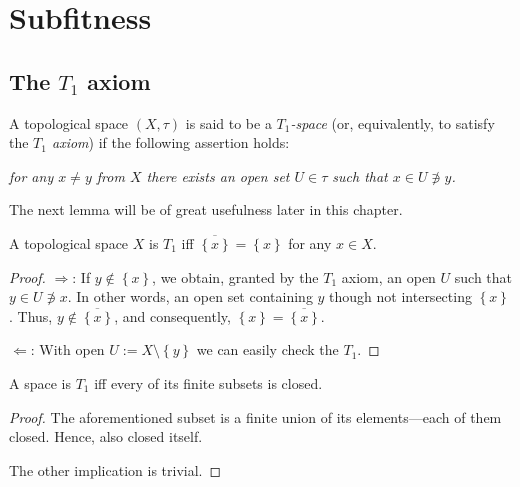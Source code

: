 \chapter{Subfitness}

\section{The $T_1$ axiom}

\begin{framed}
  \begin{df}[$T_1$]
    A topological space $(X, \tau)$ is said to be a \emph{$T_1$-space\/} (or,
    equivalently, to satisfy the \emph{$T_1$ axiom\/}) if the following assertion
    holds:
    \begin{center} \it
      for any $x \ne y$ from $X$ there exists an open set $U\in \tau$ such that
      $x\in U \not\owns y$.
    \end{center}
  \end{df}
\end{framed}

The next lemma will be of great usefulness later in this chapter.

\begin{lem} \label{T1Char}
  A topological space $X$ is $T_1$ iff $\overline{\left\{x\right\}} =
  \left\{x\right\}$ for any $x\in X$.
\end{lem}

\begin{proof}
  $\Rightarrow$: If $y\not\in \left\{x\right\}$, we obtain, granted by the
  $T_1$ axiom, an open $U$ such that $y\in U\not\owns x$.
  In other words, an open set containing $y$ though not intersecting
  $\left\{x\right\}$.
  Thus, $y\not\in \overline{\left\{x\right\}}$, and consequently,
  $\left\{x\right\} = \overline{\left\{x\right\}}$.

  $\Leftarrow$: With open $U:= X\setminus \left\{y\right\}$ we can easily
  check the $T_1$.
\end{proof}

\begin{cor}
  A space is $T_1$ iff every of its finite subsets is closed.
\end{cor}

\begin{proof}
  The aforementioned subset is a finite union of its elements---each of them
  closed.
  Hence, also closed itself.

  The other implication is trivial.
\end{proof}

